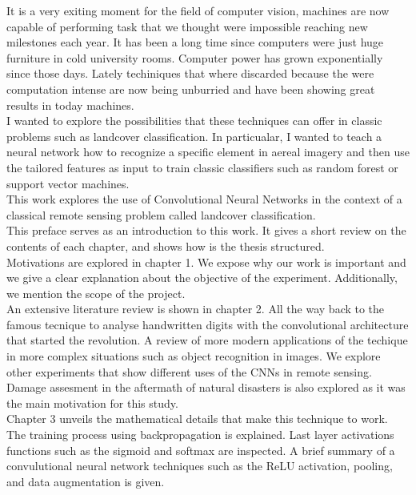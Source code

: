 It is a very exiting moment for the field of computer vision, machines are now capable of performing task that we thought were impossible reaching new milestones each year. It has been a long time since computers were just huge furniture in cold university rooms. Computer power has grown exponentially since those days. Lately techiniques that where discarded because the were computation intense are now being unburried and have been showing great results in today machines.\\

I wanted to explore the possibilities that these techniques can offer in classic problems such as landcover classification. In particualar, I wanted to teach a neural network how to recognize a specific element in aereal imagery and then use the tailored features as input to train classic classifiers such as random forest or support vector machines.\\

This work explores the use of Convolutional Neural Networks in the context of a classical remote sensing problem called landcover classification.\\

This preface serves as an introduction to this work. It gives a short review on the contents of each chapter, and shows how is the thesis structured.\\

Motivations are explored in chapter 1. We expose why our work is important and we give a clear explanation about the objective of the experiment. Additionally, we mention the scope of the project.\\

An extensive literature review is shown in chapter 2. All the way back to the famous tecnique to analyse handwritten digits with the convolutional architecture that started the revolution. A review of more modern applications of the techique in more complex situations such as object recognition in images. We explore other experiments that show different uses of the CNNs in remote sensing. Damage assesment in the aftermath of natural disasters is also explored as it was the main motivation for this study.\\

Chapter 3 unveils the mathematical details that make this technique to work. The training process using backpropagation is explained. Last layer activations functions such as the sigmoid and softmax are inspected. A brief summary of a convulutional neural network techniques such as the ReLU activation, pooling, and data augmentation is given.\\

